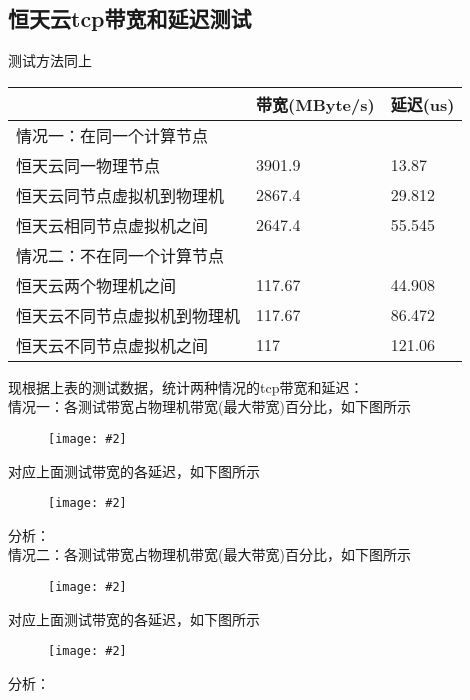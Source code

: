\documentclass[a4paper,left=1.5cm,right=1.5cm,11pt]{article}
\newcommand{\sizedfic}[2]{\begin{figure}[H]
		\center
		\texttt{[image: \#2]}
	\end{figure}}
\begin{document}
\subsection{恒天云tcp带宽和延迟测试}
测试方法同上
\begin{center}
\begin{tabular}[c]{|l|l|l|}
\hline
 &  带宽(MByte/s)&延迟(us) \\
\hline
 情况一：在同一个计算节点 &  &\\
\hline
 恒天云同一物理节点 & 3901.9&13.87 \\
\hline
 恒天云同节点虚拟机到物理机& 2867.4&29.812 \\
\hline
 恒天云相同节点虚拟机之间& 2647.4&55.545 \\
 \hline
 \hline

 情况二：不在同一个计算节点&  &\\
 \hline
 恒天云两个物理机之间& 117.67&44.908 \\
 \hline
 恒天云不同节点虚拟机到物理机 & 117.67&86.472 \\
 \hline
 恒天云不同节点虚拟机之间& 117&121.06 \\
 \hline
\hline
\end{tabular}
\end{center}

现根据上表的测试数据，统计两种情况的tcp带宽和延迟：\\
情况一：各测试带宽占物理机带宽(最大带宽)百分比，如下图所示\\
\sizedfic{0.6}{tcp_bw_11.png}
对应上面测试带宽的各延迟，如下图所示\\
\sizedfic{0.6}{tcp_lat_11.png}
分析：\\
情况二：各测试带宽占物理机带宽(最大带宽)百分比，如下图所示\\
\sizedfic{0.6}{tcp_bw_22.png}
对应上面测试带宽的各延迟，如下图所示\\
\sizedfic{0.6}{tcp_lat_22.png}
分析：\\
\end{document}
